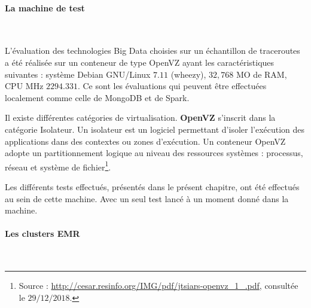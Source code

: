 \paragraph{La machine de test}~

 L'évaluation des technologies Big Data choisies sur un échantillon de traceroutes a été réalisée sur un conteneur de type OpenVZ ayant les caractéristiques suivantes :  système Debian GNU/Linux $ 7.11 $ (wheezy),  $ 32,768 $ MO de  RAM, CPU MHz $ 2294.331 $. Ce sont les évaluations qui peuvent être effectuées localement comme celle de MongoDB et de Spark.

\begin{tcolorbox}
	Il existe différentes catégories de virtualisation. \textbf{OpenVZ} s'inscrit dans la catégorie Isolateur. Un isolateur est un logiciel permettant d'isoler l'exécution des applications dans des contextes ou zones d'exécution. Un conteneur OpenVZ  adopte un partitionnement logique au niveau des ressources systèmes : processus, réseau et système de fichier\footnote{Source : \url{http://cesar.resinfo.org/IMG/pdf/jtsiars-openvz_1_.pdf}, consultée le $29/12/2018$.}.
\end{tcolorbox}

Les différents tests effectués, présentés dans le présent chapitre, ont été effectués  au sein de cette machine. Avec un seul test  lancé à un moment donné dans la machine.

\paragraph{Les clusters EMR}~

